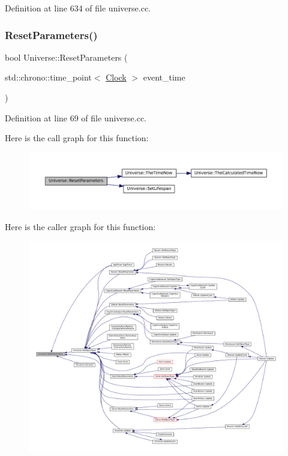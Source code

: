Definition at line 634 of file universe.\+cc.

\mbox{\label{class_universe_a1d92b2277564577571c802f6e0c206dd}} 
\subsubsection{\texorpdfstring{Reset\+Parameters()}{ResetParameters()}}
{\footnotesize\ttfamily bool Universe\+::\+Reset\+Parameters (\begin{DoxyParamCaption}\item[{std\+::chrono\+::time\+\_\+point$<$ \mbox{\hyperlink{universe_8h_a0ef8d951d1ca5ab3cfaf7ab4c7a6fd80}{Clock}} $>$}]{event\+\_\+time }\end{DoxyParamCaption})}



Definition at line 69 of file universe.\+cc.

Here is the call graph for this function\+:\nopagebreak
\begin{figure}[H]
\begin{center}
\leavevmode
\includegraphics[width=350pt]{class_universe_a1d92b2277564577571c802f6e0c206dd_cgraph}
\end{center}
\end{figure}
Here is the caller graph for this function\+:\nopagebreak
\begin{figure}[H]
\begin{center}
\leavevmode
\includegraphics[width=350pt]{class_universe_a1d92b2277564577571c802f6e0c206dd_icgraph}
\end{center}
\end{figure}
\mbox{\label{class_universe_aeda74e3902c0e56c0c09779854045cde}} 

